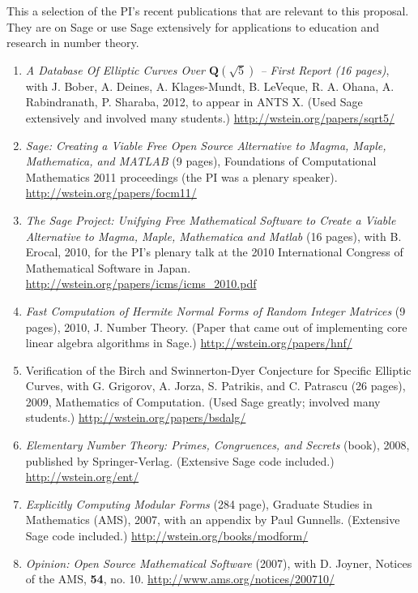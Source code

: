 \documentclass[11pt]{article}
\begin{document}
\noindent{}This a selection of the PI's recent publications that are
relevant to this proposal.  They are on Sage or use Sage extensively
for applications to education and research in number theory.


\begin{enumerate}\setlength{\itemsep}{0ex}

\item \emph{A Database Of Elliptic Curves Over $\mathbf{Q}(\sqrt{5})$ -- First
  Report (16 pages)}, with J. Bober, A. Deines, A. Klages-Mundt,
  B. LeVeque, R. A. Ohana, A. Rabindranath, P. Sharaba, 2012, to
  appear in ANTS X. (Used Sage extensively and involved many
  students.) \url{http://wstein.org/papers/sqrt5/}

\item \emph{Sage: Creating a Viable Free Open Source Alternative to
  Magma, Maple, Mathematica, and MATLAB} (9 pages), Foundations of
  Computational Mathematics 2011 proceedings (the PI was a plenary
  speaker). \url{http://wstein.org/papers/focm11/}

\item \emph{The Sage Project: Unifying Free Mathematical Software to
  Create a Viable Alternative to Magma, Maple, Mathematica and Matlab}
  (16 pages), with B. Erocal, 2010, for the PI's plenary talk at
  the 2010 International Congress of Mathematical Software in Japan.
\url{http://wstein.org/papers/icms/icms_2010.pdf}

\item \emph{Fast Computation of Hermite Normal Forms of Random Integer Matrices}
(9 pages), 2010, J. Number Theory.  (Paper that came out of implementing core linear
 algebra algorithms in Sage.) \url{http://wstein.org/papers/hnf/}

 \item {\ptitle Verification of the Birch and Swinnerton-Dyer
   Conjecture for Specific Elliptic Curves}, with G. Grigorov, A.
   Jorza, S. Patrikis, and C. Patrascu (26 pages), 2009, 
   Mathematics of Computation.   (Used Sage greatly; involved many students.)
\url{http://wstein.org/papers/bsdalg/}

\item \emph{Elementary Number Theory: Primes, Congruences, and Secrets}
 (book), 2008, published by Springer-Verlag. (Extensive Sage code included.)
\url{http://wstein.org/ent/}

 \item \emph{Explicitly {C}omputing {M}odular {F}orms} (284 page),
 Graduate Studies in Mathematics (AMS), 
 2007, with an appendix by Paul Gunnells. (Extensive Sage code included.)
\url{http://wstein.org/books/modform/}

 \item \emph{Opinion: Open Source Mathematical Software} (2007), with
   D. Joyner, Notices of the AMS, {\bf 54}, no. 10.
\url{http://www.ams.org/notices/200710/}



\end{enumerate}
\end{document}
